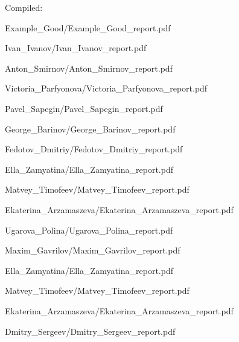 \documentclass[a4paper]{article}
\begin{document}
Compiled: \DTMnow
\tableofcontents

\clearpage

{Example_Good/Example_Good_report.pdf}

{Ivan_Ivanov/Ivan_Ivanov_report.pdf}

{Anton_Smirnov/Anton_Smirnov_report.pdf}

{Victoria_Parfyonova/Victoria_Parfyonova_report.pdf}

{Pavel_Sapegin/Pavel_Sapegin_report.pdf}

{George_Barinov/George_Barinov_report.pdf}

{Fedotov_Dmitriy/Fedotov_Dmitriy_report.pdf}

{Ella_Zamyatina/Ella_Zamyatina_report.pdf}

{Matvey_Timofeev/Matvey_Timofeev_report.pdf}

{Ekaterina_Arzamaszeva/Ekaterina_Arzamaszeva_report.pdf}

{Ugarova_Polina/Ugarova_Polina_report.pdf}


{Maxim_Gavrilov/Maxim_Gavrilov_report.pdf}

{Ella_Zamyatina/Ella_Zamyatina_report.pdf}

{Matvey_Timofeev/Matvey_Timofeev_report.pdf}

{Ekaterina_Arzamaszeva/Ekaterina_Arzamaszeva_report.pdf}

{Dmitry_Sergeev/Dmitry_Sergeev_report.pdf}
\end{document}
